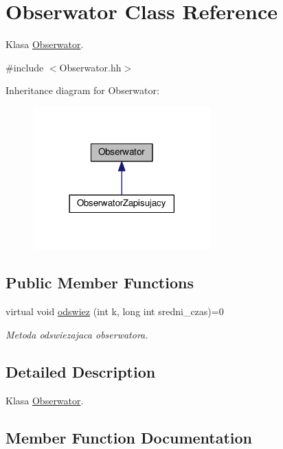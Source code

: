 \hypertarget{a00013}{}\section{Obserwator Class Reference}
\label{a00013}


Klasa \hyperlink{a00013}{Obserwator}.  




{\ttfamily \#include $<$Obserwator.\+hh$>$}



Inheritance diagram for Obserwator\+:
\nopagebreak
\begin{figure}[H]
\begin{center}
\leavevmode
\includegraphics[width=194pt]{a00137}
\end{center}
\end{figure}
\subsection*{Public Member Functions}
\begin{DoxyCompactItemize}
\item 
virtual void \hyperlink{a00013_a35f475b38bb63eac2a4d08a8d27aff7a}{odswiez} (int k, long int sredni\+\_\+czas)=0
\begin{DoxyCompactList}\small\item\em Metoda odswiezajaca obserwatora. \end{DoxyCompactList}\end{DoxyCompactItemize}


\subsection{Detailed Description}
Klasa \hyperlink{a00013}{Obserwator}. 

\subsection{Member Function Documentation}
\hypertarget{a00013_a35f475b38bb63eac2a4d08a8d27aff7a}{}
